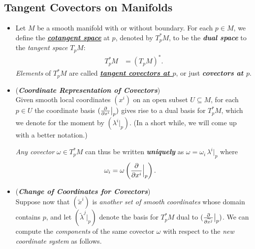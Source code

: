\documentclass[11pt]{article}
\begin{document}
\subsection{Tangent Covectors on Manifolds}
\begin{itemize}
\item 
\begin{definition}
Let $M$ be a smooth manifold with or without boundary. For each $p \in M$, we define the \underline{\emph{\textbf{cotangent space}}} at $p$, denoted by $T_{p}^{*}M$, to be the \emph{\textbf{dual space}} to the \emph{tangent space} $T_{p}M$:
\begin{align*}
T_{p}^{*}M  &= (T_{p}M)^{*}.
\end{align*} \emph{Elements} of $T_{p}^{*}M$ are called \underline{\emph{\textbf{tangent covectors at $p$}}}, or just \emph{\textbf{covectors at $p$}}.
\end{definition}

\item 
\begin{remark} (\emph{\textbf{Coordinate Representation of Covectors}}) \citep{lee2003introduction}\\
Given smooth local coordinates $(x^i)$ on an open subset $U \subseteq M$, for each $p \in U$ the coordinate basis $(\frac{\partial }{ \partial x^{i}}\big|_{p})$ gives rise to a dual basis for $T_{p}^{*}M$, which we denote for the moment by $(\lambda^i\big|_{p})$. (In a short while, we will come up with a better notation.) 

\emph{Any covector} $\omega \in T_{p}^{*}M$ can thus be written \emph{\textbf{uniquely}} as $\omega = \omega_{i}\,\lambda^i\big|_{p}$ where
\begin{align}
\omega_{i} &= \omega\left(\frac{\partial }{ \partial x^{i}}\Bigr|_{p}\right). \label{eqn: covectors_components}
\end{align}
\end{remark}

\item \begin{remark} (\emph{\textbf{Change of Coordinates for Covectors}}) \citep{lee2003introduction}\\
Suppose now that  $(\widetilde{x}^i)$ is \emph{another set of smooth coordinates} whose domain contains $p$, and let $(\widetilde{\lambda}^{j}\big|_{p})$ denote the basis for $T_{p}^{*}M$ dual to $(\frac{\partial }{ \partial \widetilde{x}^{j}}\big|_{p})$. We can compute the \emph{components} of the same covector $\omega$ with respect to the \emph{new coordinate system} as follows. 


\end{remark}
\end{itemize}
\end{document}
